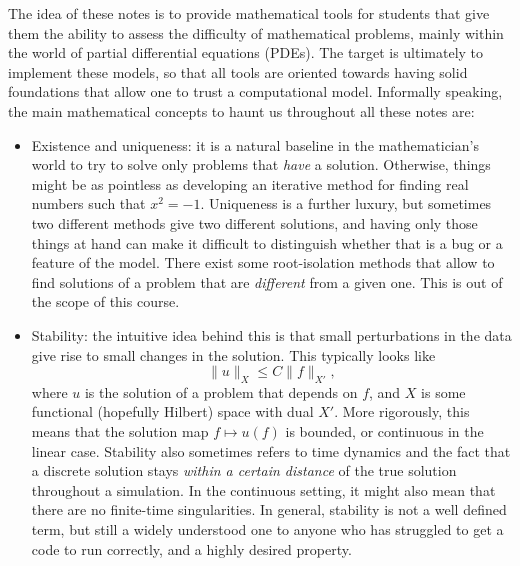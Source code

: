 The idea of these notes is to provide mathematical tools for students that give them the ability to assess the difficulty of mathematical problems, mainly within the world of partial differential equations (PDEs). The target is ultimately to implement these models, so that all tools are oriented towards having solid foundations that allow one to trust a computational model. Informally speaking, the main mathematical concepts to haunt us throughout all these notes are: 
\begin{itemize}
    \item Existence and uniqueness: it is a natural baseline in the mathematician's world to try to solve only problems that \emph{have} a solution. Otherwise, things might be as pointless as developing an iterative method for finding real numbers such that $x^2 = -1$. Uniqueness is a further luxury, but sometimes two different methods give two different solutions, and having only those things at hand can make it difficult to distinguish whether that is a bug or a feature of the model. There exist some root-isolation methods that allow to find solutions of a problem that are \emph{different} from a given one. This is out of the scope of this course. 
    \item Stability: the intuitive idea behind this is that small perturbations in the data give rise to small changes in the solution. This typically looks like 
    \begin{equation*}
        \| u\|_X \leq C\| f\|_{X'},
    \end{equation*}
    where $u$ is the solution of a problem that depends on $f$, and $X$ is some functional (hopefully Hilbert) space with dual $X'$. More rigorously, this means that the solution map $f \mapsto u(f)$ is bounded, or continuous in the linear case. Stability also sometimes refers to time dynamics and the fact that a discrete solution stays \emph{within a certain distance} of the true solution throughout a simulation. In the continuous setting, it might also mean that there are no finite-time singularities. In general, stability is not a well defined term, but still a widely understood one to anyone who has struggled to get a code to run correctly, and a highly desired property. 
\end{itemize}
